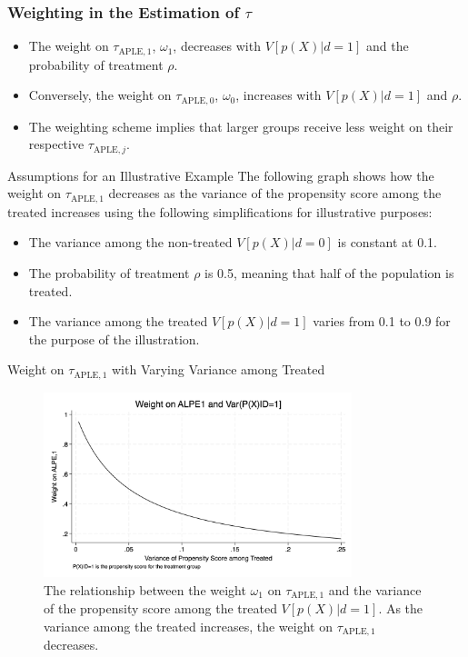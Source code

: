 \documentclass{beamer}
\begin{document}
\begin{frame}
\frametitle{Weighting in the Estimation of \( \tau \)}
\begin{itemize}
    \item The weight on \( \tau_{\text{APLE},1} \), \( \omega_1 \), decreases with \( V[p(X) | d = 1] \) and the probability of treatment \( \rho \).
    \item Conversely, the weight on \( \tau_{\text{APLE},0} \), \( \omega_0 \), increases with \( V[p(X) | d = 1] \) and \( \rho \).
    \item The weighting scheme implies that larger groups receive less weight on their respective \( \tau_{\text{APLE},j} \).
\end{itemize}
\end{frame}


\begin{frame}{Assumptions for an Illustrative Example}
    The following graph shows how the weight on \( \tau_{\text{APLE},1} \) decreases as the variance of the propensity score among the treated increases using the following simplifications for illustrative purposes:
    \begin{itemize}
        \item The variance among the non-treated \( V[p(X) | d = 0] \) is constant at 0.1.
        \item The probability of treatment \( \rho \) is 0.5, meaning that half of the population is treated.
        \item The variance among the treated \( V[p(X) | d = 1] \) varies from 0.1 to 0.9 for the purpose of the illustration.
    \end{itemize}
\end{frame}


\begin{frame}{Weight on \( \tau_{\text{APLE},1} \) with Varying Variance among Treated}
    \begin{figure}
        \centering
        \includegraphics[width=0.8\textwidth]{./lecture_includes/tymon_variance_weight.png}
        \caption{The relationship between the weight \( \omega_1 \) on \( \tau_{\text{APLE},1} \) and the variance of the propensity score among the treated \( V[p(X) | d = 1] \). As the variance among the treated increases, the weight on \( \tau_{\text{APLE},1} \) decreases.}
    \end{figure}
\end{frame}
\end{document}
